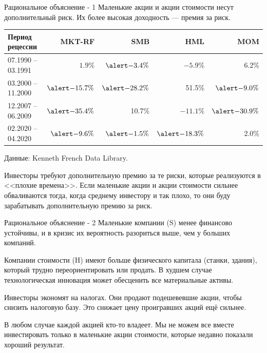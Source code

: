 \documentclass{beamer}
\begin{document}
\begin{frame}{Рациональное объяснение - 1}
\justify
Маленькие акции и акции стоимости несут дополнительный риск. Их более высокая
доходность --- премия за риск.

\justify
\centering
\begin{tabular}{l|r|r|r|r}
Период рецессии    & MKT-RF  & SMB & HML & MOM \\ \hline
07.1990 -- 03.1991 & $1.9\%$ & $\alert{-3.4\%}$ & \alert{$-5.9\%$} & 6.2\% \\
03.2000 -- 11.2000 & $\alert{-15.7\%}$ & $\alert{-28.2\%}$ & 51.5\% & $\alert{-9.0\%}$ \\
12.2007 -- 06.2009 & $\alert{-35.4\%}$ & 10.7\% & \alert{$-11.1\%$} & $\alert{-30.9\%}$ \\
02.2020 -- 04.2020 & $\alert{-9.6\%}$ & $\alert{-1.5\%}$ & $\alert{-18.3\%}$ & 2.0\%
\end{tabular}
\centering
{\scriptsize Данные: Kenneth French Data Library.}

\justify
Инвесторы требуют дополнительную премию за те риски, которые реализуются в
<<плохие времена>>. Если маленькие акции и акции стоимости сильнее обваливаются 
тогда, когда среднему инвестору и так плохо, то они буду зарабатывать
дополнительную премию за риск.
\end{frame}



\begin{frame}{Рациональное объяснение - 2}
\justify
Маленькие компании (S) менее финансово устойчивы, и в кризис их вероятность
разориться выше, чем у больших компаний.

\justify
Компании стоимости (H) имеют больше физического капитала (станки, здания), 
который трудно переориентировать или продать. В худшем случае технологическая 
инновация может обесценить все материальные активы.

\justify
Инвесторы экономят на налогах. Они продают подешевевшие акции, чтобы снизить 
налоговую базу. Это снижает цену проигравших акций ещё сильнее.

\justify
В любом случае каждой акцией кто-то владеет. Мы не можем все вместе 
инвестировать только в маленькие акции стоимости, которые недавно показали
хороший результат.
\end{frame}
\end{document}
